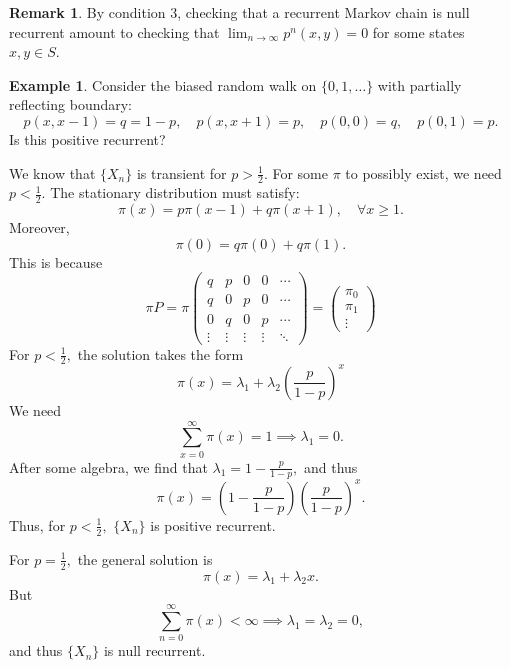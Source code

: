 \documentclass[10pt, oneside]{article}
\theoremstyle{definition}
\newtheorem{exmp}{Example}[section]
\newtheorem{rem}{Remark}
\begin{document}
\begin{rem}
    By condition 3, checking that a recurrent Markov chain is null recurrent amount to checking that $\lim_{n\to \infty}p^n(x,y) = 0$ for some states $x,y \in S.$
\end{rem}
\begin{exmp}
    Consider the biased random walk on $\{0,1, \dots\}$ with partially reflecting boundary: 
    \[p(x,x-1) = q= 1-p, \quad p(x,x+1) = p, \quad p(0,0) = q, \quad p(0,1) =p.\]
    Is this positive recurrent?

    We know that $\{X_n\}$ is transient for $p > \frac{1}{2}.$ For some $\pi$ to possibly exist, we need $p < \frac{1}{2}.$ The stationary distribution must satisfy:
    \[\pi(x) = p\pi(x-1) + q\pi(x+1), \quad \forall x\geq 1.\] Moreover, 
    \[\pi(0) = q\pi(0) + q\pi(1).\] This is because 
    \[\pi P = \pi \begin{pmatrix}
        q & p & 0 & 0 & \cdots\\
        q & 0 & p & 0 & \cdots \\
        0 & q & 0 & p& \cdots\\
        \vdots&\vdots& \vdots & \vdots &\ddots
    \end{pmatrix} = \begin{pmatrix}
        \pi_0\\ \pi_1 \\
        \vdots
    \end{pmatrix}\] For $p < \frac{1}{2},$ the solution takes the form 
    \[\pi(x) = \lambda_1 + \lambda_2 (\frac{p}{1-p})^x\] We need 
    \[\sum_{x = 0}^\infty \pi(x) = 1 \implies \lambda_1 = 0.\] After some algebra, we find that $\lambda_1 = 1- \frac{p}{1-p},$ and thus 
    \[\pi(x) = (1- \frac{p}{1-p})(\frac{p}{1-p})^x.\] Thus, for $p< \frac{1}{2},$ $\{X_n\}$ is positive recurrent. 
    
    For $p = \frac{1}{2},$ the general solution is 
    \[\pi(x) = \lambda_1 + \lambda_2 x.\] But
    \[\sum_{n=0}^\infty \pi(x) < \infty \implies \lambda_1 = \lambda_2 = 0,\] and thus $\{X_n\}$ is null recurrent. 
\end{exmp}




















\newpage
\end{document}
